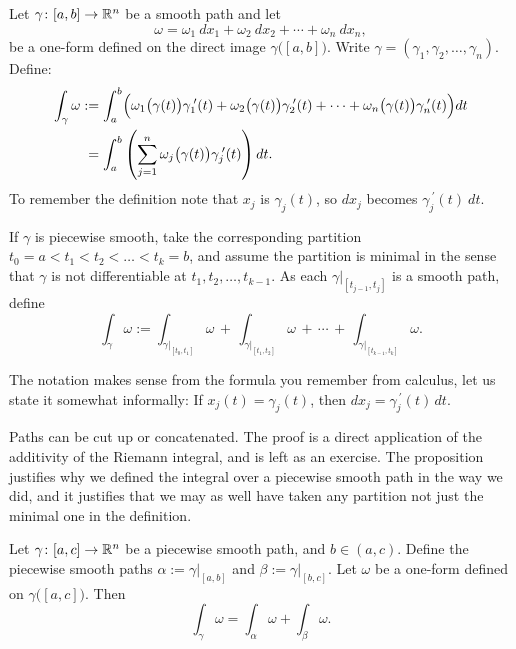 \begin{defn}
Let $\gamma \colon [a,b] \to {\mathbb{R}}^n$ be a smooth path
and let
\begin{equation*}
\omega = \omega_1 ~dx_1 + \omega_2 ~dx_2 + \cdots + \omega_n ~dx_n ,
\end{equation*}
be a one-form defined on the direct image $\gamma\bigl([a,b]\bigr)$.
Write $\gamma = (\gamma_1,\gamma_2,\ldots,\gamma_n)$.
Define:
\begin{equation*}
\begin{split}
\int_{\gamma} \omega
& :=
\int_a^b 
\Bigl(
\omega_1\bigl(\gamma(t)\bigr) \gamma_1^{\:\prime}(t) +
\omega_2\bigl(\gamma(t)\bigr) \gamma_2^{\:\prime}(t) + \cdots +
\omega_n\bigl(\gamma(t)\bigr) \gamma_n^{\:\prime}(t) \Bigr) dt
\\
&\phantom{:}=
\int_a^b 
\left(
\sum_{j=1}^n
\omega_j\bigl(\gamma(t)\bigr) \gamma_j^{\:\prime}(t) \right) dt .
\end{split}
\end{equation*}
To remember the definition note that $x_j$ is $\gamma_j(t)$, so
$dx_j$ becomes  $\gamma_j^{\:\prime}(t) ~ dt$.

If $\gamma$ is piecewise smooth, take the corresponding partition
$t_0 = a < t_1 < t_2 < \ldots < t_k = b$, and assume the partition is
minimal
in the sense that $\gamma$ is not differentiable
at $t_1,t_2,\ldots,t_{k-1}$.  As each $\gamma|_{[t_{j-1},t_j]}$ is
a smooth path, define
\begin{equation*}
\int_{\gamma} \omega
:=
\int_{\gamma|_{[t_0,t_1]}} \omega
\,
+
\,
\int_{\gamma|_{[t_1,t_2]}} \omega
\,
+ \, \cdots \, + \,
\int_{\gamma|_{[t_{k-1},t_k]}} \omega .
\end{equation*}
\end{defn}

The notation makes sense from the formula you remember from calculus,
let us state it somewhat informally:
If $x_j(t) = \gamma_j(t)$, then $dx_j = \gamma_j^{\:\prime}(t) \, dt$.

Paths can be cut up or concatenated.  The proof is a direct application
of the additivity of the Riemann integral, and is left as an exercise.
The proposition justifies why we defined the integral over a piecewise
smooth path in the way we did, and it justifies that we may as well
have taken any partition not just the minimal one in the definition.

\begin{prop} \label{mv:prop:pathconcat}
Let $\gamma \colon [a,c] \to {\mathbb{R}}^n$ be a piecewise smooth path,
and $b \in (a,c)$.
Define the piecewise smooth paths
$\alpha := \gamma|_{[a,b]}$ and
$\beta := \gamma|_{[b,c]}$.
Let $\omega$ be a one-form defined on
$\gamma\bigl([a,c]\bigr)$.  Then
\begin{equation*}
\int_{\gamma} \omega =
\int_{\alpha} \omega +
\int_{\beta} \omega .
\end{equation*}
\end{prop}


